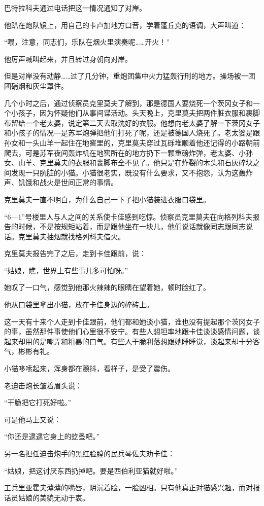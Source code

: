 巴特拉科夫通过电话把这一情况通知了对岸。

他趴在炮队镜上，用自己的卡卢加地方口音，学着蓬丘克的语调，大声叫道：

“喂，注意，同志们，乐队在烟火里演奏呢……开火！”

他厉声喊叫起来，并且转过身朝向对岸。

但是对岸没有动静……过了几分钟，重炮团集中火力猛轰行刑的地方。操场被一团团硝烟和灰尘罩住。

几个小时之后，通过侦察员克里莫夫了解到，那是德国人要烧死一个茨冈女子和一个小孩子，因为怀疑他们从事间谍活动。头天晚上，克里莫夫把两件脏衣服和裹脚布留给一个老太婆，说定第二天去取洗好的衣服。他想向老太婆了解一下茨冈女子和小孩子的情况—是苏军炮弹把他们打死了呢，还是被德国人烧死了。老太婆是跟孙女和一头山羊一起住在地窖里的，克里莫夫穿过瓦砾堆顺着他还记得的小路朝前爬去，可是苏军夜间轰炸机在地窖所在的地方扔下一颗重磅炸弹，老太婆、小孙女、山羊、克里莫夫的衣服和裹脚布全不见了。他只是在炸裂的木头和石灰碎块之间发现一只肮脏的小猫。小猫很老实，既没有什么要求，又不抱怨，认为这轰炸声、饥饿和战火是世间正常的事情。

克里莫夫一直不明白，为什么自己一下子把小猫装进衣服口袋里。

“6—1”号楼里人与人之间的关系使卡佳感到吃惊。侦察员克里莫夫在向格列科夫报告的时候，不是按规矩站着，而是跟他坐在一块儿，他们说话就像同志跟同志说话。克里莫夫抽烟就找格列科夫借火。

克里莫夫报告完了之后，走到卡佳跟前，说：

“姑娘，瞧，世界上有些事儿多可怕呀。”

她叹了一口气，感觉到他那火辣辣的眼睛在望着她，顿时脸红了。

他从口袋里拿出小猫，放在卡佳身边的碎砖上。

这一天有十来个人走到卡佳跟前，他们都和她谈小猫，谁也没有提起那个茨冈女子的事，虽然那件事使他们心里很不安宁。有些人想坦率地跟卡佳谈谈感情问题，谈起来却用的是嘲弄和粗暴的口气。有些人干脆利落想跟她睡睡觉，谈起来却十分客气，彬彬有礼。

小猫哆嗦起来，浑身都在颤抖，看样子，是受了震伤。

老迫击炮长皱着眉头说：

“干脆把它打死好啦。”

可是他马上又说：

“你还是逮逮它身上的虼蚤吧。”

另一名担任迫击炮手的黑红脸膛的民兵琴佐夫劝卡佳：

“姑娘，把这讨厌东西扔掉吧。要是西伯利亚猫就好啦。”

工兵里亚霍夫薄薄的嘴唇，阴沉着脸，一脸凶相。只有他真正对猫感兴趣，而对报话员姑娘的美貌无动于衷。

